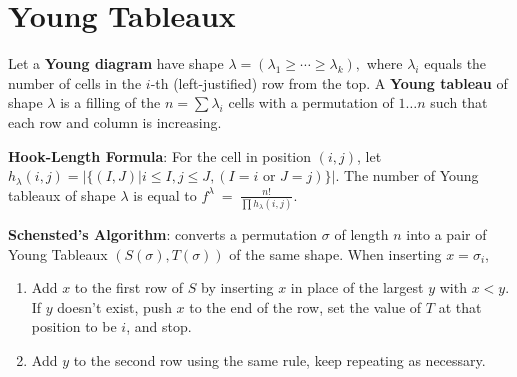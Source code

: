\section{Young Tableaux}

Let a \textbf{Young diagram} have shape $\lambda=(\lambda_1\geq \cdots\geq \lambda_k),$ where $\lambda_i$ equals the number of cells in the $i$-th (left-justified) row from the top. A \textbf{Young tableau} of shape $\lambda$ is a filling of the $n=\sum \lambda_i$ cells with a permutation of $1\ldots n$ such that each row and  column is increasing.

\textbf{Hook-Length Formula}: For the cell in position $(i,j)$, let $h_\lambda(i,j)=\left|\{(I,J)|i\le I, j\le J, (I=i\text{ or }J=j)\}\right|.$ The number of Young tableaux of shape $\lambda$ is equal to
$f^\lambda \ =\ \frac{n!}{\prod h_\lambda (i,j)}.$

\textbf{Schensted's Algorithm}: converts a permutation $\sigma$ of length $n$ into a pair of Young Tableaux $(S(\sigma),T(\sigma))$ of the same shape. When inserting $x=\sigma_i$,

\begin{enumerate}
\item Add $x$ to the first row of $S$ by inserting $x$ in place of the largest $y$ with $x<y$. If $y$ doesn't exist, push $x$ to the end of the row, set the value of $T$ at that position to be $i$, and stop.
\item Add $y$ to the second row using the same rule, keep repeating as necessary.
\end{enumerate}

